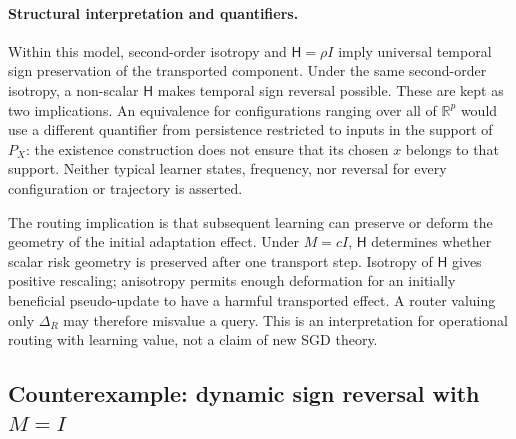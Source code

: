 \paragraph{Structural interpretation and quantifiers.}
Within this model, second-order isotropy and $\mathsf H=\rho I$ imply
universal temporal sign preservation of the transported component.
Under the same second-order isotropy, a non-scalar $\mathsf H$ makes
temporal sign reversal possible. These are kept as two implications.
An equivalence for configurations ranging over all of $\mathbb R^p$
would use a different quantifier from persistence restricted to inputs in
the support of $P_X$: the existence construction does not ensure that
its chosen $x$ belongs to that support. Neither typical learner states,
frequency, nor reversal for every configuration or trajectory is asserted.

The routing implication is that subsequent learning can preserve or deform
the geometry of the initial adaptation effect. Under $M=cI$, $\mathsf H$
determines whether scalar risk geometry is preserved after one transport
step. Isotropy of $\mathsf H$ gives positive rescaling; anisotropy permits
enough deformation for an initially beneficial pseudo-update to have a
harmful transported effect. A router valuing only $\Delta_R$ may therefore
misvalue a query. This is an interpretation for operational routing with
learning value, not a claim of new SGD theory.

\subsection{Counterexample: dynamic sign reversal with $M=I$}

